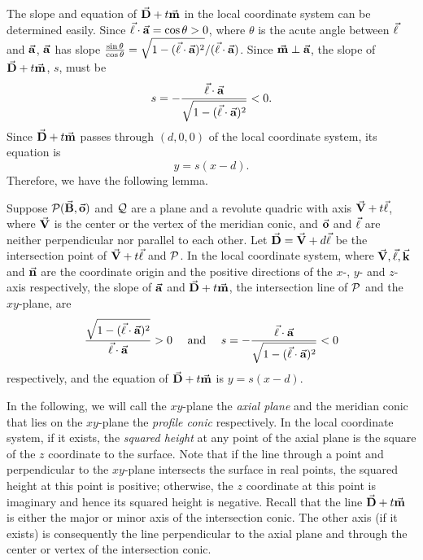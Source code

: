      The slope and  equation of $\vec{\bf D}+t\vec{\bf m}$ in the local
coordinate system can be determined easily.
Since $\vec{\bf \ell}\cdot\vec{\bf a}=\cos\theta>0$, where $\theta$ is the acute
angle between $\vec{\bf \ell}$ and $\vec{\bf a}$, $\vec{\bf a}$ has slope
$\frac{\sin\theta}{\cos\theta}=
\sqrt{1-(\vec{\bf \ell}\cdot\vec{\bf a})^2}/(\vec{\bf \ell}\cdot\vec{\bf a})$.
Since $\vec{\bf m}\perp\vec{\bf a}$, the slope of $\vec{\bf D}+t\vec{\bf m}$, $s$,
must be
\begin{equation}
\label{eqn:slope-s}
     s=-\frac{\vec{\bf \ell}\cdot\vec{\bf a}}
           {\sqrt{1-(\vec{\bf \ell}\cdot\vec{\bf a})^2}} < 0.
\end{equation}
Since $\vec{\bf D}+t\vec{\bf m}$ passes through $(d,0,0)$ of the local coordinate
system, its equation is
\begin{equation}
\label{eqn:d+tm}
     y = s(x-d).
\end{equation}
Therefore, we have the following lemma.

\begin{lemma}
\label{lemma:vectors}
     Suppose ${\cal P}(\vec{\bf B},\vec{\bf o})$ and ${\cal Q}$ are a plane and
a revolute quadric with axis $\vec{\bf V}+t\vec{\bf \ell}$, where $\vec{\bf V}$ is
the center or the vertex of the meridian conic, and $\vec{\bf o}$ and
$\vec{\bf \ell}$ are neither perpendicular nor parallel to each other.
Let $\vec{\bf D}=\vec{\bf V}+d\vec{\bf \ell}$ be the intersection point
of $\vec{\bf V}+t\vec{\bf \ell}$ and ${\cal P}$.  In the local coordinate system,
where $\vec{\bf V},\vec{\bf \ell},\vec{\bf k}$ and $\vec{\bf n}$ are the coordinate
origin and the positive directions of the $x$-, $y$- and $z$-axis respectively,
the slope of $\vec{\bf a}$ and $\vec{\bf D}+t\vec{\bf m}$, the intersection line of
${\cal P}$ and the $xy$-plane, are
\[
\frac{\sqrt{1-(\vec{\bf \ell}\cdot\vec{\bf a})^2}}{\vec{\bf \ell}\cdot\vec{\bf a}}>0
\ \ \ \ \mbox{and}\ \ \ \
s=-\frac{\vec{\bf \ell}\cdot\vec{\bf a}}{\sqrt{1-(\vec{\bf \ell}\cdot\vec{\bf a})^2}}<0
\]
respectively, and the equation of $\vec{\bf D}+t\vec{\bf m}$ is $y=s(x-d)$.
\end{lemma}

     In the following, we will call the $xy$-plane the {\em axial plane} and
the meridian conic that lies on the $xy$-plane the {\em profile conic}
respectively.   In the local coordinate system, if it exists, the
{\em squared height} at any point of the axial plane is the square
of the $z$ coordinate to the surface.  Note that if the line through a point
and perpendicular to the $xy$-plane intersects the surface in real points,
the squared height at this point is positive;
otherwise, the $z$ coordinate at this point is imaginary and hence
its squared height is negative.
Recall that the line $\vec{\bf D}+t\vec{\bf m}$ is either the major
or minor axis of the intersection conic.
The other axis (if it exists) is consequently the line perpendicular to the
axial plane and through the center or vertex of the intersection conic.

